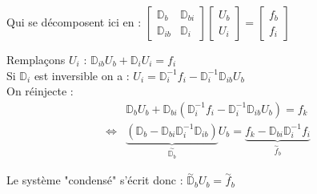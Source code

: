 \documentclass[12pt,a4paper]{article}
\begin{document}
	Qui se décomposent ici en : $\left[\begin{matrix}
		\mathbb{D}_b & \mathbb{D}_{bi} \\
		\mathbb{D}_{ib} & \mathbb{D}_{i}
	\end{matrix}\right]\left[\begin{matrix}
		U_b \\ U_i
	\end{matrix}\right] = \left[\begin{matrix}
		f_b \\ f_i
	\end{matrix}\right]$
	
	Remplaçons $U_i$ : $\mathbb D_{ib}U_b + \mathbb D_iU_i = f_i$\\
	Si $\mathbb{D}_i$ est inversible on a : $U_i = \mathbb{D}_i^{-1} f_i - \mathbb{D}_i^{-1}\mathbb D_{ib} U_b$\\
	On réinjecte :
	\[
	\begin{aligned}
		&\mathbb D_bU_b+\mathbb{D}_{bi}\left(\mathbb D_i^{-1}f_i - \mathbb D_i^{-1}\mathbb{D}_{ib}U_b\right) = f_k\\
		\iff & \underbrace{\left(\mathbb D_b-\mathbb D_{bi}\mathbb D_i^{-1}\mathbb D_{ib}\right)}_{\overset\sim{\mathbb{D}_b}}U_b = \underbrace{f_k-\mathbb D_{bi}\mathbb D_i^{-1}f_i}_{\overset\sim f_b}
	\end{aligned}
	\]
	
	Le système "condensé" s'écrit donc : $\overset\sim{\mathbb{D}}_bU_b=\overset\sim f_b$
	
\end{document}

